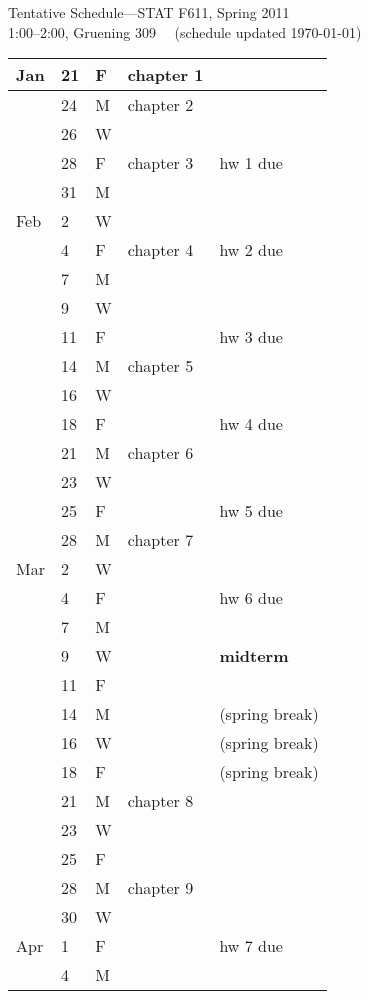 \documentclass{article}
\begin{document}
\begin{center}
{\Large Tentative Schedule---STAT F611, Spring 2011}\\[2mm]
1:00--2:00, Gruening 309 \ \ (schedule updated \today)
\end{center}
\bigskip
\thispagestyle{empty}

\renewcommand\arraystretch{1.06}
\hskip-6mm
\begin{tabular*}{0.99\textwidth}{%
    p{}%
    p{}%
    p{}%
    |p{}%
    |p{}}
\hline
Jan
& 21 & F & chapter 1& \\
\hline
& 24 & M & chapter 2& \\
& 26 & W & & \\
& 28 & F & chapter 3& hw 1 due\\
\hline
& 31 & M & & \\
Feb
& 2 & W & & \\
& 4 & F & chapter 4& hw 2 due\\
\hline
& 7 & M & & \\
& 9 & W & & \\
& 11 & F & & hw 3 due\\
\hline
& 14 & M & chapter 5& \\
& 16 & W & & \\
& 18 & F & & hw 4 due\\
\hline
& 21 & M & chapter 6& \\
& 23 & W & & \\
& 25 & F & & hw 5 due\\
\hline
& 28 & M & chapter 7& \\
Mar
& 2 & W & & \\
& 4 & F & & hw 6 due\\
\hline
& 7 & M & &\\
& 9 & W & & \textbf{midterm} \\
& 11 & F & & \\
\hline
& 14 & M & & (spring break) \\
& 16 & W & & (spring break) \\
& 18 & F & & (spring break) \\
\hline
& 21 & M & chapter 8&\\
& 23 & W & &\\
& 25 & F & & \\
\hline
& 28 & M & chapter 9& \\
& 30 & W & & \\
Apr
& 1 & F & & hw 7 due\\
\hline
& 4 & M & & \\

\end{tabular*}
\end{document}
